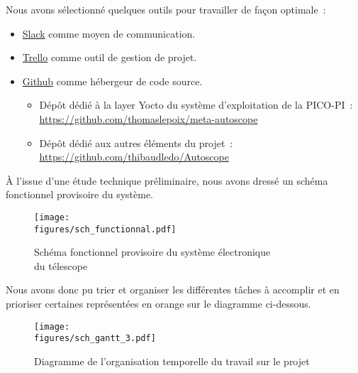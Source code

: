 Nous avons sélectionné quelques outils pour travailler de façon optimale~:
\begin{itemize}[label=$\bullet$]
	\item {\href{https://slack.com}{Slack}} comme moyen de communication.
	\item {\href{https://trello.com}{Trello}} comme outil de gestion de projet.
	\item {\href{https://github.com}{Github}} comme hébergeur de code source.
	\begin{itemize}
		\item Dépôt dédié à la layer Yocto du système d'exploitation de la PICO-PI~:\\\url{https://github.com/thomaslepoix/meta-autoscope}
		\item Dépôt dédié aux autres éléments du projet~:\\\url{https://github.com/thibaudledo/Autoscope}
		\end{itemize}
	\end{itemize}

\vspace{1cm}

À l'issue d'une étude technique préliminaire, nous avons dressé un schéma fonctionnel provisoire du système.

\begin{figure}[H]
	\centering
    \texttt{[image: \\figures/sch\_functionnal.pdf]}
    \decoRule
    \caption[
    Schéma fonctionnel provisoire du système électronique du télescope]{
    Schéma fonctionnel provisoire du système électronique\\du télescope}
    \label{fig:Schéma fonctionnel provisoire du système électronique du télescope}
	\end{figure}

\vspace{1cm}

Nous avons donc pu trier et organiser les différentes tâches à accomplir et en prioriser certaines représentées en orange sur le diagramme ci-dessous.

\begin{figure}[H]
	\centering
    \texttt{[image: \\figures/sch\_gantt\_3.pdf]}
    \decoRule
    \caption[
    Diagramme de l'organisation temporelle du travail sur le projet]{
    Diagramme de l'organisation temporelle du travail sur le projet}
    \label{fig:Diagramme de l'organisation temporelle du travail sur le projet}
	\end{figure}

